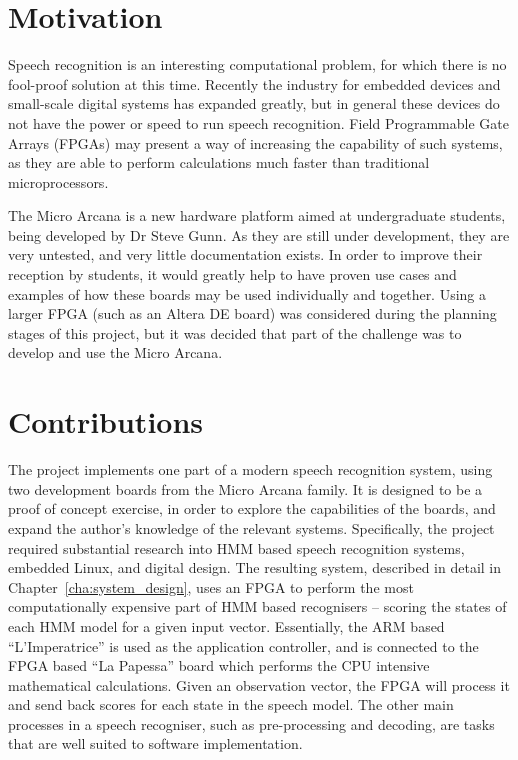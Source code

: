 
\section{Motivation} %
\label{sec:motivation}
	Speech recognition is an interesting computational problem, for which there is no fool-proof solution at this time.  Recently the industry for embedded devices and small-scale digital systems has expanded greatly, but in general these devices do not have the power or speed to run speech recognition.  Field Programmable Gate Arrays (FPGAs) may present a way of increasing the capability of such systems, as they are able to perform calculations much faster than traditional microprocessors.  

	The Micro Arcana is a new hardware platform aimed at undergraduate students, being developed by Dr Steve Gunn.  As they are still under development, they are very untested, and very little documentation exists.  In order to improve their reception by students, it would greatly help to have proven use cases and examples of how these boards may be used individually and together.  Using a larger FPGA (such as an Altera DE board) was considered during the planning stages of this project, but it was decided that part of the challenge was to develop and use the Micro Arcana.

\section{Contributions} %
\label{sec:contributions}
	The project implements one part of a modern speech recognition system, using two development boards from the Micro Arcana family.  It is designed to be a proof of concept exercise, in order to explore the capabilities of the boards, and expand the author's knowledge of the relevant systems.  Specifically, the project required substantial research into HMM based speech recognition systems, embedded Linux, and digital design.  The resulting system, described in detail in Chapter~\ref{cha:system_design}, uses an FPGA to perform the most computationally expensive part of HMM based recognisers -- scoring the states of each HMM model for a given input vector.  Essentially, the ARM based ``L'Imperatrice'' is used as the application controller, and is connected to the FPGA based ``La Papessa'' board which performs the CPU intensive mathematical calculations.  Given an observation vector, the FPGA will process it and send back scores for each state in the speech model.  The other main processes in a speech recogniser, such as pre-processing and decoding, are tasks that are well suited to software implementation.


